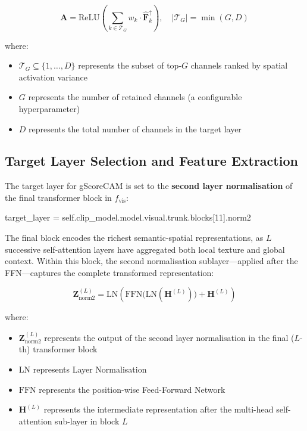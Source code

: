 \[
\mathbf{A} = \text{ReLU}\!\left(\sum_{k \in \mathcal{T}_G} w_k \cdot \hat{\mathbf{F}}_k^{\uparrow}\right), \quad |\mathcal{T}_G| = \min(G, D)
\]

where:
\begin{itemize}
\item $\mathcal{T}_G \subseteq \{1, \ldots, D\}$ represents the subset of top-$G$ channels ranked by spatial activation variance
\item $G$ represents the number of retained channels (a configurable hyperparameter)
\item $D$ represents the total number of channels in the target layer
\end{itemize}

\subsection{Target Layer Selection and Feature Extraction}

 The target layer for gScoreCAM is set to the \textbf{second layer normalisation} of the final transformer block in $f_{\text{vis}}$:

\begin{pythoncode}
target_layer = self.clip_model.model.visual.trunk.blocks[11].norm2
\end{pythoncode}

The final block encodes the richest semantic-spatial representations, as $L$ successive self-attention layers have aggregated both local texture and global context. Within this block, the second normalisation sublayer---applied after the FFN---captures the complete transformed representation:

\[
\mathbf{Z}^{(L)}_{\text{norm2}} = \text{LN}\!\left(\text{FFN}\!\bigl(\text{LN}(\mathbf{H}^{(L)})\bigr) + \mathbf{H}^{(L)}\right)
\]

where:
\begin{itemize}
\item $\mathbf{Z}^{(L)}_{\text{norm2}}$ represents the output of the second layer normalisation in the final ($L$-th) transformer block
\item $\text{LN}$ represents Layer Normalisation
\item $\text{FFN}$ represents the position-wise Feed-Forward Network
\item $\mathbf{H}^{(L)}$ represents the intermediate representation after the multi-head self-attention sub-layer in block $L$
\end{itemize}

